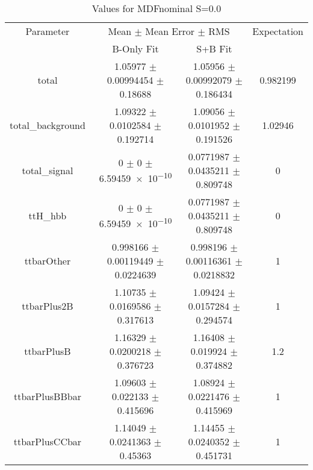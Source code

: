 \begin{table}
\centering
\caption{Values for MDFnominal S=0.0}
\begin{tabular}{cccc}
\toprule
Parameter & \multicolumn{2}{c}{Mean $\pm$ Mean Error $\pm$ RMS} & Expectation\\
 & B-Only Fit & S+B Fit & \\
\midrule
total & \num{1.05977} $\pm$ \num{0.00994454} $\pm$ \num{0.18688} & \num{1.05956} $\pm$ \num{0.00992079} $\pm$ \num{0.186434} & \num{0.982199}\\
total\_background & \num{1.09322} $\pm$ \num{0.0102584} $\pm$ \num{0.192714} & \num{1.09056} $\pm$ \num{0.0101952} $\pm$ \num{0.191526} & \num{1.02946}\\
total\_signal & \num{0} $\pm$ \num{0} $\pm$ \num{6.59459e-10} & \num{0.0771987} $\pm$ \num{0.0435211} $\pm$ \num{0.809748} & \num{0}\\
ttH\_hbb & \num{0} $\pm$ \num{0} $\pm$ \num{6.59459e-10} & \num{0.0771987} $\pm$ \num{0.0435211} $\pm$ \num{0.809748} & \num{0}\\
ttbarOther & \num{0.998166} $\pm$ \num{0.00119449} $\pm$ \num{0.0224639} & \num{0.998196} $\pm$ \num{0.00116361} $\pm$ \num{0.0218832} & \num{1}\\
ttbarPlus2B & \num{1.10735} $\pm$ \num{0.0169586} $\pm$ \num{0.317613} & \num{1.09424} $\pm$ \num{0.0157284} $\pm$ \num{0.294574} & \num{1}\\
ttbarPlusB & \num{1.16329} $\pm$ \num{0.0200218} $\pm$ \num{0.376723} & \num{1.16408} $\pm$ \num{0.019924} $\pm$ \num{0.374882} & \num{1.2}\\
ttbarPlusBBbar & \num{1.09603} $\pm$ \num{0.022133} $\pm$ \num{0.415696} & \num{1.08924} $\pm$ \num{0.0221476} $\pm$ \num{0.415969} & \num{1}\\
ttbarPlusCCbar & \num{1.14049} $\pm$ \num{0.0241363} $\pm$ \num{0.45363} & \num{1.14455} $\pm$ \num{0.0240352} $\pm$ \num{0.451731} & \num{1}\\
\bottomrule
\end{tabular}
\end{table}